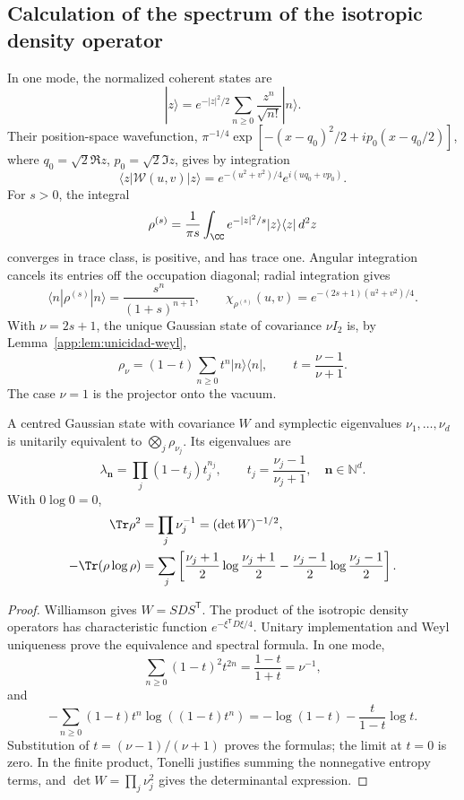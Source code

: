 \subsection{Calculation of the spectrum of the isotropic density operator}
In one mode, the normalized coherent states are
\[
 |z\rangle=e^{-|z|^2/2}\sum_{n\geq0}\frac{z^n}{\sqrt{n!}}|n\rangle.
\]
Their position-space wavefunction, \(\pi^{-1/4}\exp[-(x-q_0)^2/2+ip_0(x-q_0/2)]\), where \(q_0=\sqrt2\Re z\), \(p_0=\sqrt2\Im z\), gives by integration
\[
 \langle z|\mathcal W(u,v)|z\rangle
 =e^{-(u^2+v^2)/4}e^{i(uq_0+vp_0)}.
\]
For \(s>0\), the integral
\[
 \rho^{(s)}=\frac1{\pi s}\int_{\CC} e^{-|z|^2/s}
 |z\rangle\langle z|\,d^2z
\]
converges in trace class, is positive, and has trace one. Angular integration cancels its entries off the occupation diagonal; radial integration gives
\[
 \langle n|\rho^{(s)}|n\rangle=\frac{s^n}{(1+s)^{n+1}},\qquad
 \chi_{\rho^{(s)}}(u,v)=e^{-(2s+1)(u^2+v^2)/4}.
\]
With \(\nu=2s+1\), the unique Gaussian state of covariance \(\nu I_2\) is, by Lemma~\ref{app:lem:unicidad-weyl},
\begin{equation}
 \rho_\nu=(1-t)\sum_{n\geq0}t^n|n\rangle\langle n|,
 \qquad t=\frac{\nu-1}{\nu+1}.
 \label{app:eq:estado-geometrico}
\end{equation}
The case \(\nu=1\) is the projector onto the vacuum.

\begin{theorem}
\label{app:thm:espectro-gaussiano}
A centred Gaussian state with covariance \(W\) and symplectic eigenvalues \(\nu_1,\ldots,\nu_d\) is unitarily equivalent to \(\bigotimes_j\rho_{\nu_j}\). Its eigenvalues are
\[
 \lambda_{\symbf{n}}=\prod_j(1-t_j)t_j^{n_j},\qquad
 t_j=\frac{\nu_j-1}{\nu_j+1},\quad \symbf{n}\in\mathbb N^d.
\]
With \(0\log0=0\),
\begin{align}
 \Tr\rho^2&=\prod_j\nu_j^{-1}=(\det W)^{-1/2},
 \label{app:eq:pureza-general}\\
 -\Tr(\rho\log\rho)&=\sum_j
 \left[\frac{\nu_j+1}{2}\log\frac{\nu_j+1}{2}
 -\frac{\nu_j-1}{2}\log\frac{\nu_j-1}{2}\right].
 \label{app:eq:entropia-general}
\end{align}
\end{theorem}
\begin{proof}
Williamson gives \(W=SDS^{\mathsf T}\). The product of the isotropic density operators has characteristic function \(e^{-\xi^{\mathsf T}D\xi/4}\). Unitary implementation and Weyl uniqueness prove the equivalence and spectral formula. In one mode,
\[
 \sum_{n\geq0}(1-t)^2t^{2n}=\frac{1-t}{1+t}=\nu^{-1},
\]
and
\[
 -\sum_{n\geq0}(1-t)t^n\log((1-t)t^n)
 =-\log(1-t)-\frac{t}{1-t}\log t.
\]
Substitution of \(t=(\nu-1)/(\nu+1)\) proves the formulas; the limit at \(t=0\) is zero. In the finite product, Tonelli justifies summing the nonnegative entropy terms, and \(\det W=\prod_j\nu_j^2\) gives the determinantal expression.
\end{proof}

